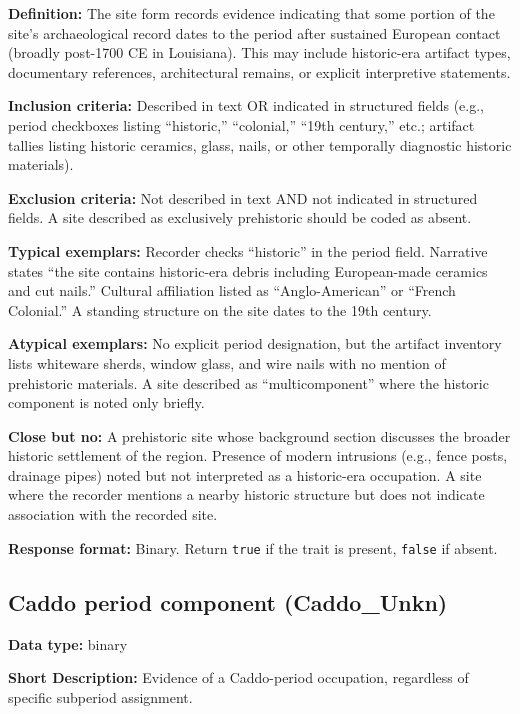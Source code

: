 \documentclass[
]{article}
\begin{document}
\textbf{Definition:} The site form records evidence indicating that some
portion of the site's archaeological record dates to the period after
sustained European contact (broadly post-1700 CE in Louisiana). This may
include historic-era artifact types, documentary references,
architectural remains, or explicit interpretive statements.

\textbf{Inclusion criteria:} Described in text OR indicated in
structured fields (e.g., period checkboxes listing ``historic,''
``colonial,'' ``19th century,'' etc.; artifact tallies listing historic
ceramics, glass, nails, or other temporally diagnostic historic
materials).

\textbf{Exclusion criteria:} Not described in text AND not indicated in
structured fields. A site described as exclusively prehistoric should be
coded as absent.

\textbf{Typical exemplars:} Recorder checks ``historic'' in the period
field. Narrative states ``the site contains historic-era debris
including European-made ceramics and cut nails.'' Cultural affiliation
listed as ``Anglo-American'' or ``French Colonial.'' A standing
structure on the site dates to the 19th century.

\textbf{Atypical exemplars:} No explicit period designation, but the
artifact inventory lists whiteware sherds, window glass, and wire nails
with no mention of prehistoric materials. A site described as
``multicomponent'' where the historic component is noted only briefly.

\textbf{Close but no:} A prehistoric site whose background section
discusses the broader historic settlement of the region. Presence of
modern intrusions (e.g., fence posts, drainage pipes) noted but not
interpreted as a historic-era occupation. A site where the recorder
mentions a nearby historic structure but does not indicate association
with the recorded site.

\textbf{Response format:} Binary. Return \texttt{true} if the trait is
present, \texttt{false} if absent.

\subsection{Caddo period component
(Caddo\_Unkn)}\label{caddo-period-component-caddo_unkn}

\textbf{Data type:} binary

\textbf{Short Description:} Evidence of a Caddo-period occupation,
regardless of specific subperiod assignment.
\end{document}
